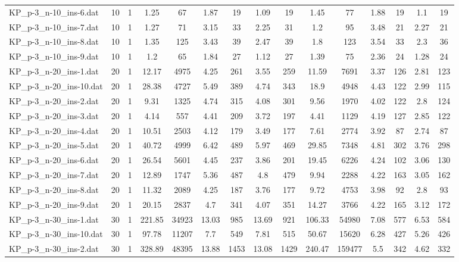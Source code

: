 \begin{table}[!ht]
{\begin{tabular}{lcccccccccccccc}
KP\_p-3\_n-10\_ins-6.dat & 10 & 1 & 1.25 & 67 & 1.87 & 19 & 1.09 & 19 & 1.45 & 77 & 1.88 & 19 & 1.1 & 19 \\
KP\_p-3\_n-10\_ins-7.dat & 10 & 1 & 1.27 & 71 & 3.15 & 33 & 2.25 & 31 & 1.2 & 95 & 3.48 & 21 & 2.27 & 21 \\
KP\_p-3\_n-10\_ins-8.dat & 10 & 1 & 1.35 & 125 & 3.43 & 39 & 2.47 & 39 & 1.8 & 123 & 3.54 & 33 & 2.3 & 36 \\
KP\_p-3\_n-10\_ins-9.dat & 10 & 1 & 1.2 & 65 & 1.84 & 27 & 1.12 & 27 & 1.39 & 75 & 2.36 & 24 & 1.28 & 24 \\
KP\_p-3\_n-20\_ins-1.dat & 20 & 1 & 12.17 & 4975 & 4.25 & 261 & 3.55 & 259 & 11.59 & 7691 & 3.37 & 126 & 2.81 & 123 \\
KP\_p-3\_n-20\_ins-10.dat & 20 & 1 & 28.38 & 4727 & 5.49 & 389 & 4.74 & 343 & 18.9 & 4948 & 4.43 & 122 & 2.99 & 115 \\
KP\_p-3\_n-20\_ins-2.dat & 20 & 1 & 9.31 & 1325 & 4.74 & 315 & 4.08 & 301 & 9.56 & 1970 & 4.02 & 122 & 2.8 & 124 \\
KP\_p-3\_n-20\_ins-3.dat & 20 & 1 & 4.14 & 557 & 4.41 & 209 & 3.72 & 197 & 4.41 & 1129 & 4.19 & 127 & 2.85 & 122 \\
KP\_p-3\_n-20\_ins-4.dat & 20 & 1 & 10.51 & 2503 & 4.12 & 179 & 3.49 & 177 & 7.61 & 2774 & 3.92 & 87 & 2.74 & 87 \\
KP\_p-3\_n-20\_ins-5.dat & 20 & 1 & 40.72 & 4999 & 6.42 & 489 & 5.97 & 469 & 29.85 & 7348 & 4.81 & 302 & 3.76 & 298 \\
KP\_p-3\_n-20\_ins-6.dat & 20 & 1 & 26.54 & 5601 & 4.45 & 237 & 3.86 & 201 & 19.45 & 6226 & 4.24 & 102 & 3.06 & 130 \\
KP\_p-3\_n-20\_ins-7.dat & 20 & 1 & 12.89 & 1747 & 5.36 & 487 & 4.8 & 479 & 9.94 & 2288 & 4.22 & 163 & 3.05 & 162 \\
KP\_p-3\_n-20\_ins-8.dat & 20 & 1 & 11.32 & 2089 & 4.25 & 187 & 3.76 & 177 & 9.72 & 4753 & 3.98 & 92 & 2.8 & 93 \\
KP\_p-3\_n-20\_ins-9.dat & 20 & 1 & 20.15 & 2837 & 4.7 & 341 & 4.07 & 351 & 14.27 & 3766 & 4.22 & 165 & 3.12 & 172 \\
KP\_p-3\_n-30\_ins-1.dat & 30 & 1 & 221.85 & 34923 & 13.03 & 985 & 13.69 & 921 & 106.33 & 54980 & 7.08 & 577 & 6.53 & 584 \\
KP\_p-3\_n-30\_ins-10.dat & 30 & 1 & 97.78 & 11207 & 7.7 & 549 & 7.81 & 515 & 50.67 & 15620 & 6.28 & 427 & 5.26 & 426 \\
KP\_p-3\_n-30\_ins-2.dat & 30 & 1 & 328.89 & 48395 & 13.88 & 1453 & 13.08 & 1429 & 240.47 & 159477 & 5.5 & 342 & 4.62 & 332 \\

\end{tabular}}
\end{table}
